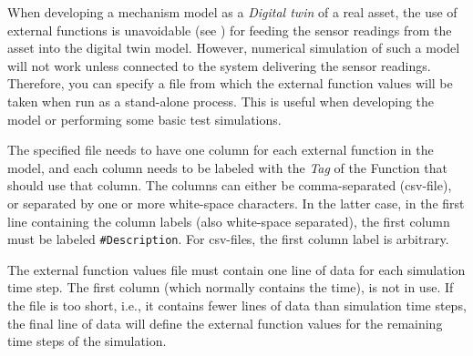 
When developing a mechanism model as a {\sl Digital twin} of a real asset,
the use of external functions is unavoidable
(see )
for feeding the sensor readings from the asset into the digital twin model.
However, numerical simulation of such a model will not work unless connected to
the system delivering the sensor readings.
Therefore, you can specify a file from which the external function values
will be taken when run as a stand-alone process. This is useful when developing
the model or performing some basic test simulations.

The specified file needs to have one column for each external function in the
model, and each column needs to be labeled with the {\sl Tag} of the Function
that should use that column. The columns can either be comma-separated
(csv-file), or separated by one or more white-space characters.
In the latter case, in the first line containing the column labels (also
white-space separated), the first column must be labeled {\tt\#Description}.
For csv-files, the first column label is arbitrary.

The external function values file must contain one line of data for each
simulation time step. The first column (which normally contains the time),
is not in use. If the file is too short, i.e., it contains fewer lines of data
than simulation time steps, the final line of data will define the external
function values for the remaining time steps of the simulation.


